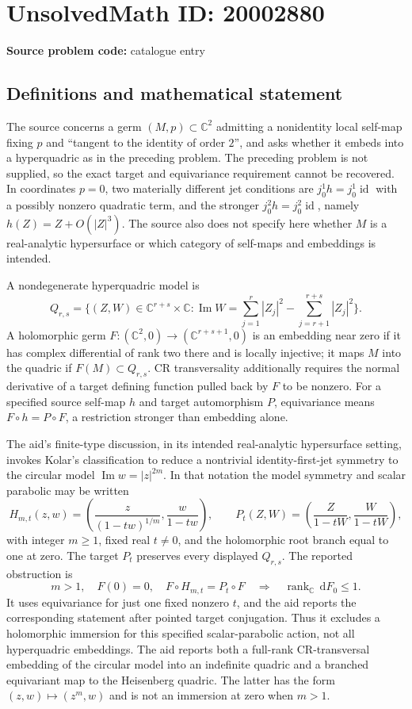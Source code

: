 \documentclass[11pt]{article}
\newcommand{\C}{\mathbb{C}}
\newcommand{\dd}{\,\mathrm{d}}
\begin{document}
\section*{UnsolvedMath ID: 20002880}
\textbf{Source problem code:} catalogue entry
\subsection{Definitions and mathematical statement}
The source concerns a germ $(M,p)\subset\C^2$ admitting a nonidentity local self-map fixing $p$ and ``tangent to the identity of order $2$'', and asks whether it embeds into a hyperquadric as in the preceding problem. The preceding problem is not supplied, so the exact target and equivariance requirement cannot be recovered. In coordinates $p=0$, two materially different jet conditions are $j^1_0h=j^1_0\operatorname{id}$ with a possibly nonzero quadratic term, and the stronger $j^2_0h=j^2_0\operatorname{id}$, namely $h(Z)=Z+O(|Z|^3)$. The source also does not specify here whether $M$ is a real-analytic hypersurface or which category of self-maps and embeddings is intended.

A nondegenerate hyperquadric model is
\[
Q_{r,s}=\{(Z,W)\in\C^{r+s}\times\C:\operatorname{Im}W=\sum_{j=1}^r|Z_j|^2-\sum_{j=r+1}^{r+s}|Z_j|^2\}.
\]
A holomorphic germ $F:(\C^2,0)\to(\C^{r+s+1},0)$ is an embedding near zero if it has complex differential of rank two there and is locally injective; it maps $M$ into the quadric if $F(M)\subset Q_{r,s}$. CR transversality additionally requires the normal derivative of a target defining function pulled back by $F$ to be nonzero. For a specified source self-map $h$ and target automorphism $P$, equivariance means $F\circ h=P\circ F$, a restriction stronger than embedding alone.

The aid's finite-type discussion, in its intended real-analytic hypersurface setting, invokes Kolar's classification to reduce a nontrivial identity-first-jet symmetry to the circular model $\operatorname{Im}w=|z|^{2m}$. In that notation the model symmetry and scalar parabolic may be written
\[
H_{m,t}(z,w)=\left(\frac{z}{(1-tw)^{1/m}},\frac{w}{1-tw}\right),\qquad
P_t(Z,W)=\left(\frac{Z}{1-tW},\frac{W}{1-tW}\right),
\]
with integer $m\geq1$, fixed real $t\ne0$, and the holomorphic root branch equal to one at zero. The target $P_t$ preserves every displayed $Q_{r,s}$. The reported obstruction is
\[
m>1,\quad F(0)=0,\quad F\circ H_{m,t}=P_t\circ F
\quad\Longrightarrow\quad\operatorname{rank}_{\C}\dd F_0\leq1.
\]
It uses equivariance for just one fixed nonzero $t$, and the aid reports the corresponding statement after pointed target conjugation. Thus it excludes a holomorphic immersion for this specified scalar-parabolic action, not all hyperquadric embeddings. The aid reports both a full-rank CR-transversal embedding of the circular model into an indefinite quadric and a branched equivariant map to the Heisenberg quadric. The latter has the form $(z,w)\mapsto(z^m,w)$ and is not an immersion at zero when $m>1$.
\end{document}
